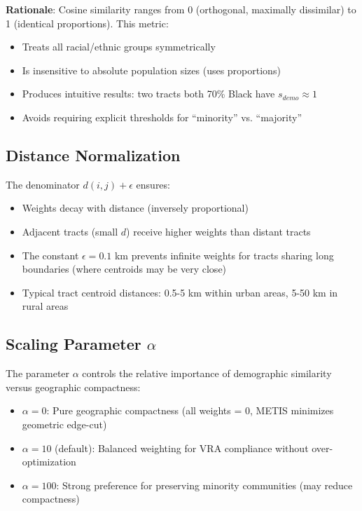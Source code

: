 \textbf{Rationale}: Cosine similarity ranges from 0 (orthogonal, maximally dissimilar) to 1 (identical proportions). This metric:
\begin{itemize}
\item Treats all racial/ethnic groups symmetrically
\item Is insensitive to absolute population sizes (uses proportions)
\item Produces intuitive results: two tracts both 70\% Black have $s_{demo} \approx 1$
\item Avoids requiring explicit thresholds for ``minority'' vs. ``majority''
\end{itemize}

\subsection{Distance Normalization}

The denominator $d(i,j) + \epsilon$ ensures:
\begin{itemize}
\item Weights decay with distance (inversely proportional)
\item Adjacent tracts (small $d$) receive higher weights than distant tracts
\item The constant $\epsilon = 0.1$ km prevents infinite weights for tracts sharing long boundaries (where centroids may be very close)
\item Typical tract centroid distances: 0.5-5 km within urban areas, 5-50 km in rural areas
\end{itemize}

\subsection{Scaling Parameter $\alpha$}

The parameter $\alpha$ controls the relative importance of demographic similarity versus geographic compactness:
\begin{itemize}
\item $\alpha = 0$: Pure geographic compactness (all weights = 0, METIS minimizes geometric edge-cut)
\item $\alpha = 10$ (default): Balanced weighting for VRA compliance without over-optimization
\item $\alpha = 100$: Strong preference for preserving minority communities (may reduce compactness)
\end{itemize}

